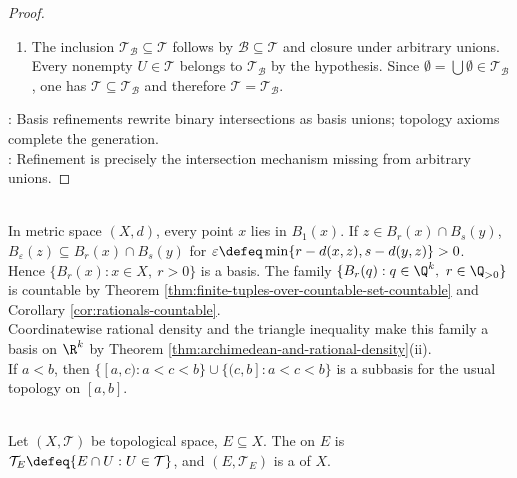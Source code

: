 \begin{proposition}
\begin{proof}
\begin{enumerate}[label=(\roman*)]
\item The inclusion $\mathcal{T}_{\mathcal{B}}\subseteq\mathcal{T}$ follows by $\mathcal{B}\subseteq\mathcal{T}$ and closure under arbitrary unions.\\
Every nonempty $U\in\mathcal{T}$ belongs to $\mathcal{T}_{\mathcal{B}}$ by the hypothesis. Since $\emptyset=\bigcup\emptyset\in\mathcal{T}_{\mathcal{B}}$, one has $\mathcal{T}\subseteq\mathcal{T}_{\mathcal{B}}$ and therefore $\mathcal{T}=\mathcal{T}_{\mathcal{B}}$.
\end{enumerate}
: Basis refinements rewrite binary intersections as basis unions; topology axioms complete the generation.\\
: Refinement is precisely the intersection mechanism missing from arbitrary unions.
\end{proof}
\end{proposition}

\begin{example} \label{ex:metric-balls-basis} \\
In metric space $(X,d)$, every point $x$ lies in $B_1(x)$. If $z\in B_r(x)\cap B_s(y)$, $B_\varepsilon(z)\subseteq B_r(x)\cap B_s(y)$ for $\varepsilon\defeq\min\{r-d(x,z),s-d(y,z)\}>0$.\\
Hence $\{B_r(x):x\in X,\ r>0\}$ is a basis. The family $\{B_r(q):q\in\Q^k,\ r\in\Q_{>0}\}$ is countable by Theorem \ref{thm:finite-tuples-over-countable-set-countable} and Corollary \ref{cor:rationals-countable}.\\
Coordinatewise rational density and the triangle inequality make this family a basis on $\R^k$ by Theorem \ref{thm:archimedean-and-rational-density}(ii).\\
If $a<b$, then $\{[a,c):a<c<b\}\cup\{(c,b]:a<c<b\}$ is a subbasis for the usual topology on $[a,b]$.
\end{example}

\begin{definition} \label{def:topological-subspace} \\
Let $(X,\mathcal{T})$ be topological space, $E\subseteq X$. The  on $E$ is $\mathcal{T}_E\defeq\{E\cap U:U\in\mathcal{T}\}$, and $(E,\mathcal{T}_E)$ is a  of $X$.
\end{definition}

